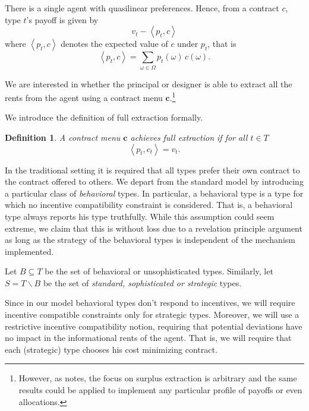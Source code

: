 \documentclass[12pt]{article}
\newtheorem{definition}{Definition}}
\begin{document}
There is a single agent with quasilinear preferences. Hence, from a contract $c$, type $t$'s payoff is given by
	\[
		v_t-\left<p_t,c\right>
	\]
where $\left<p_t,c\right>$ denotes the expected value of $c$ under $p_t$, that is 
	\[
		\left<p_t,c\right>=\sum_{\omega\in \Omega} p_t(\omega)\,c(\omega).
	\]



We are interested in whether the principal or designer is able to extract all the rents from the agent using a contract menu $\mathbf{c}$.\footnote{However, as \citet{borgersbook} notes, the focus on surplus extraction is arbitrary and the same results could be applied to implement any particular profile of payoffs or even allocations.} 




We introduce the definition of full extraction formally.

\begin{definition}\label{def_fse}
	A contract menu $\mathbf{c}$ achieves full extraction if for all $t\in T$
		\[
			\left<p_t,c_t\right>=v_t.
		\]
\end{definition}


In the traditional setting it is required that all types prefer their own contract to the contract offered to others. We depart from the standard model by introducing a particular class of \emph{behavioral} types. In particular, a behavioral type is a type for which no incentive compatibility constraint is considered. That is, a behavioral type always reports his type truthfully. While this assumption could seem extreme, we claim that this is without loss due to a revelation principle argument as long as the strategy of the behavioral types is independent of the mechanism implemented. %

Let $B\subseteq T$ be the set of behavioral or unsophisticated types. Similarly, let $S=T\backslash B$ be the set of \emph{standard, sophisticated or strategic} types. 

Since in our model behavioral types don't respond to incentives, we will require incentive compatible constraints only for strategic types. Moreover, we will use a restrictive incentive compatibility notion, requiring that potential deviations have no impact in the informational rents of the agent. That is, we will require that each (strategic) type chooses his cost minimizing contract. %
\end{document}
